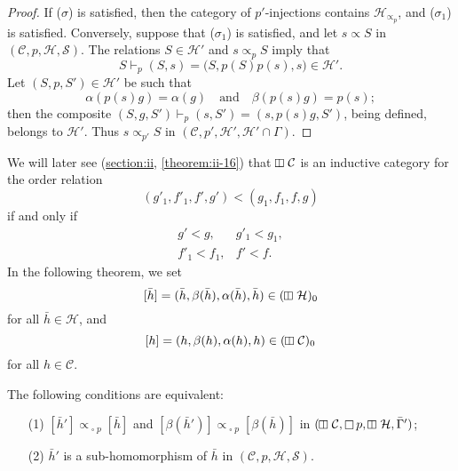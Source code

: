 \documentclass[a4paper,fleqn]{article}
\theoremstyle{plain}
\newenvironment{theorem}[1]
  {\renewcommand\theinnertheorem{#1}\innertheorem}
  {\endinnertheorem}
\theoremstyle{definition}
\newcommand{\oldpage}[1]{{\marginpar{\footnotesize$\bigg\vert$\,\,\,\,\textit{p.~#1}}}}
\newcommand{\textand}{\quad\text{and}\quad}
\newcommand{\CC}{\mathcal{C}}
\newcommand{\HH}{\mathcal{H}}
\renewcommand{\SS}{\mathcal{S}}
\newcommand{\subs}{\mathrel{\propto}}
\DeclareMathOperator{\sq}{\square}
\DeclareMathOperator{\vsq}{\raisebox{-.1em}{\rotatebox{90}{$\boxminus$}\,}}
\begin{document}
\begin{proof}
  If ($\sigma$) is satisfied, then the category of $p'$-injections contains $\HH_{\subs_p}$, and ($\sigma_1$) is satisfied.
  Conversely, suppose that ($\sigma_1$) is satisfied, and let $s\subs S$ in $(\CC,p,\HH,\SS)$.
  The relations $S\in\HH'$ and $s\subs_p S$ imply that
  \[
    S\vdash_p(S,s)
    = \big(
      S,p(S)p(s),s
    \big) \in \HH'.
  \]
  Let $(S,p,S')\in\HH'$ be such that
  \[
    \alpha(p(s)g) = \alpha(g)
    \textand
    \beta(p(s)g) = p(s);
  \]
  then the composite $(S,g,S')\vdash_p(s,S')=(s,p(s)g,S')$, being defined, belongs to $\HH'$.
  Thus $s\subs_{p'}S$ in $(\CC,p',\HH',\HH'\cap\Gamma)$.
\end{proof}

We will later see (\hyperref[§II]{section:ii}, \cref{theorem:ii-16}) that $\vsq\CC$ is an inductive category for the order relation
\[
  (g'_1,f'_1,f',g')
  < (g_1,f_1,f,g)
\]
\oldpage{368}
if and only if
\[
  \begin{array}{ll}
    g'<g,
    & g'_1<g_1,
  \\f'_1<f_1,
    & f'<f.
  \end{array}
\]
In the following theorem, we set
\[
  [\bar{h}]
  = (\bar{h},\beta(\bar{h}),\alpha(\bar{h}),\bar{h})
  \in (\vsq\HH)_0
\]
for all $\bar{h}\in\HH$, and
\[
  [h]
  = (h,\beta(h),\alpha(h),h)
  \in (\vsq\CC)_0
\]
for all $h\in\CC$.

\begin{theorem}{2}
\label{theorem:i-2}
  The following conditions are equivalent:
  \begin{enumerate}
    \item[\normalfont(1)] $[\bar{h}']\subs_{\sq p}[\bar{h}]$ and $[\beta(\bar{h}')]\subs_{\sq p}[\beta(\bar{h})]$ in $(\vsq\CC,\sq p,\vsq\HH,\bar{\Gamma}')$;
    \item[\normalfont(2)] $\bar{h}'$ is a sub-homomorphism of $\bar{h}$ in $(\CC,p,\HH,\SS)$.
  \end{enumerate}
\end{theorem}
\end{document}
